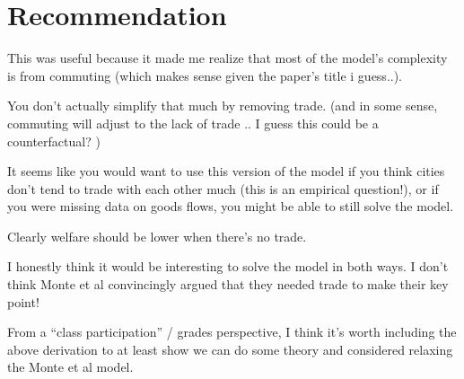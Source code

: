 \documentclass{article}
\begin{document}
\section{Recommendation}
This was useful because it made me realize that most of the model's complexity is from commuting (which makes sense given the paper's title i guess..).

You don't actually simplify that much by removing trade.  (and in some sense, commuting will adjust to the lack of trade .. I guess this could be a counterfactual? )

It seems like you would want to use this version of the model if you think cities don't tend to trade with each other much (this is an empirical question!), or if you were missing data on goods flows, you might be able to still solve the model. 

Clearly welfare should be lower when there's no trade. 

I honestly think it would be interesting to solve the model in both ways. I don't think Monte et al convincingly argued that they needed trade to make their key point!

From a ``class participation'' / grades perspective, I think it's worth including the above derivation to at least show we can do some theory and considered relaxing the Monte et al model. 
\end{document}

